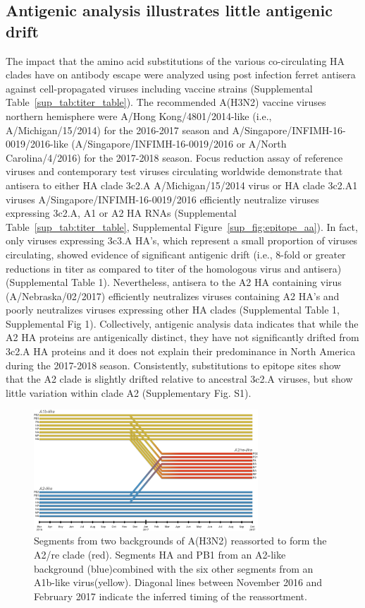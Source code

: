 \subsection*{Antigenic analysis illustrates little antigenic drift}
The impact that the amino acid substitutions of the various co-circulating HA clades have on antibody escape were analyzed using post infection ferret antisera against cell-propagated viruses including vaccine strains (Supplemental Table~\ref{sup_tab:titer_table}).
The recommended A(H3N2) vaccine viruses northern hemisphere were A/Hong Kong/4801/2014-like (i.e., A/Michigan/15/2014) for the 2016-2017 season and A/Singapore/INFIMH-16-0019/2016-like (A/Singapore/INFIMH-16-0019/2016 or A/North Carolina/4/2016) for the 2017-2018 season.
Focus reduction assay of reference viruses and contemporary test viruses circulating worldwide demonstrate that antisera to either HA clade 3c2.A A/Michigan/15/2014 virus or HA clade 3c2.A1 viruses A/Singapore/INFIMH-16-0019/2016 efficiently neutralize viruses expressing 3c2.A, A1 or A2 HA RNAs (Supplemental Table~\ref{sup_tab:titer_table}, Supplemental Figure~\ref{sup_fig:epitope_aa}).
In fact, only viruses expressing 3c3.A HA’s, which represent a small proportion of viruses circulating, showed evidence of significant antigenic drift (i.e., 8-fold or greater reductions in titer as compared to titer of the homologous virus and antisera) (Supplemental Table 1).
Nevertheless, antisera to the A2 HA containing virus (A/Nebraska/02/2017) efficiently neutralizes viruses containing A2 HA’s and poorly neutralizes viruses expressing other HA clades (Supplemental Table 1, Supplemental Fig 1).
Collectively, antigenic analysis data indicates that while the A2 HA proteins are antigenically distinct, they have not significantly drifted from 3c2.A HA proteins and it does not explain their predominance in North America during the 2017-2018 season.
Consistently, substitutions to epitope sites show that the A2 clade is slightly drifted relative to ancestral 3c2.A viruses, but show little variation within clade A2 (Supplementary Fig. S1).

\begin{figure}[t]
    \begin{center}
    \includegraphics[width=0.75\textwidth]{figures/railroad_plot.png}
    \end{center}
    \caption{Segments from two backgrounds of A(H3N2) reassorted to form the A2/re clade (red). Segments HA and PB1 from an A2-like background (blue)combined with the six other segments from an A1b-like virus(yellow). Diagonal lines between November 2016 and February 2017 indicate the inferred timing of the reassortment.}
    \label{fig:railroad}
\end{figure}

